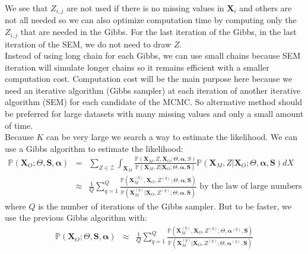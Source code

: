 \documentclass[12pt,a4paper]{report}
\begin{document}
	
	
	We see that $Z_{i,j}$ are not used if there is no missing values in $\boldsymbol{X}_i$ and others are not all needed so we can also optimize computation time by  computing only the $Z_{i,j}$ that are needed in the Gibbs.
	For the last iteration of the Gibbs, in the last iteration of the SEM, we do not need to draw $Z$.	\\
	
	Instead of using long chain for each Gibbs, we can use small chains because SEM iteration will simulate longer chains so it remains efficient with a smaller computation cost.
	Computation cost will be the main purpose here because we need an iterative algorithm (Gibbs sampler) at each iteration of another iterative algorithm (SEM) for each candidate of the MCMC.
	So alternative method should be preferred for large datasets with many missing values and only a small amount of time.\\
	
	Because $K$ can be very large we search a way to estimate the likelihood.
	We can use a Gibbs algorithm to estimate the likelihood:
	\begin{eqnarray}
	\mathbb{P}(\boldsymbol{X}_O;\Theta, \boldsymbol{S}, \boldsymbol{\alpha})&=& 
		\sum_{Z\in \mathcal{Z}}\int_{\boldsymbol{X}_M}\frac{\mathbb{P}(\boldsymbol{X}_M,Z,\boldsymbol{X}_O;\Theta,\boldsymbol{\alpha},S)}{\mathbb{P}(\boldsymbol{X}_M,Z|\boldsymbol{X}_O;\Theta,\boldsymbol{\alpha},\boldsymbol{S})}\mathbb{P}(\boldsymbol{X}_M,Z|\boldsymbol{X}_O;\Theta,\boldsymbol{\alpha},\boldsymbol{S}) dX \\
		&\approx &\frac{1}{Q} \sum_{q=1}^Q\frac{\mathbb{P}(\boldsymbol{X}_M^{(q)},\boldsymbol{X}_O,Z^{(q)};\Theta,\boldsymbol{\alpha},\boldsymbol{S})}{\mathbb{P}(\boldsymbol{X}_M^{(q)}|\boldsymbol{X}_O,Z^{(q)};\Theta,\boldsymbol{\alpha},\boldsymbol{S})} \textrm{ by the law of large numbers} \ \ \ 
	\end{eqnarray}		
	where $Q$ is the number of iterations of the Gibbs sampler.
	But to be faster, we use the previous Gibbs algorithm with:
	\begin{eqnarray}
	\mathbb{P}(\boldsymbol{X}_O;\Theta, \boldsymbol{S}, \boldsymbol{\alpha})&\approx & \frac{1}{Q} \sum_{q=1}^Q\frac{\mathbb{P}(\boldsymbol{X}_M^{(q)},\boldsymbol{X}_O,Z^{(q)};\Theta,\boldsymbol{\alpha}^{(q)},\boldsymbol{S})}{\mathbb{P}(\boldsymbol{X}_M^{(q)}|\boldsymbol{X}_O,Z^{(q)};\Theta,\boldsymbol{\alpha}^{(q)},\boldsymbol{S})}
	\end{eqnarray}	
		
\end{document}

